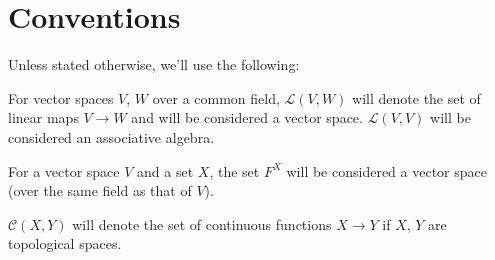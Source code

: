 \chapter*{Conventions}

\begin{conv}
	Unless stated otherwise, we'll use the following:
	\begin{assmplist}
		\item For vector spaces $V$, $W$ over a common field, $\mathcal L(V, W)$ will denote the set of linear maps $V\to W$ and will be considered a vector space. $\mathcal L(V, V)$ will be considered an associative algebra.
		
		\item For a vector space $V$ and a set $X$, the set $F^X$ will be considered a vector space (over the same field as that of $V$).
		
		
		\item $\mathcal C(X, Y)$ will denote the set of continuous functions $X\to Y$ if $X$, $Y$ are topological spaces.
	\end{assmplist}
\end{conv}